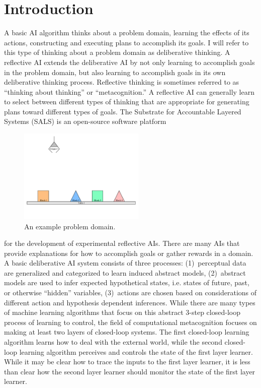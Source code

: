 \chapter{Introduction}
\label{chapter:introduction}

A basic AI algorithm thinks about a problem domain, learning the
effects of its actions, constructing and executing plans to accomplish
its goals.  I will refer to this type of thinking about a problem
domain as deliberative thinking.  A reflective AI extends the
deliberative AI by not only learning to accomplish goals in the
problem domain, but also learning to accomplish goals in its own
deliberative thinking process.  Reflective thinking is sometimes
referred to as ``thinking about thinking'' or ``metacognition.''  A
reflective AI can generally learn to select between different types of
thinking that are appropriate for generating plans toward different
types of goals.  The Substrate for Accountable Layered Systems (SALS)
is an open-source software platform
\begin{figure}
  \includegraphics[width=6cm]{gfx/blocks_world_large-01}
  \caption[An example problem domain.]{An example problem domain.}
  \label{figure:introduction_example_problem_domain}
\end{figure}
for the development of experimental reflective AIs.  There are many
AIs that provide explanations for how to accomplish goals or gather
rewards in a domain.  A basic deliberative AI system consists of three
processes: {\mbox{(1)~perceptual}} data are generalized and
categorized to learn induced abstract models, {\mbox{(2)~abstract}}
models are used to infer expected hypothetical states, i.e. states of
future, past, or otherwise ``hidden'' variables, {\mbox{(3)~actions}}
are chosen based on considerations of different action and hypothesis
dependent inferences.  While there are many types of machine learning
algorithms that focus on this abstract 3-step closed-loop process of
learning to control, the field of computational metacognition
\cite[]{cox_and_raja:2008,cox:2010} focuses on making at least two
layers of closed-loop systems.  The first closed-loop learning
algorithm learns how to deal with the external world, while the second
closed-loop learning algorithm perceives and controls the state of the
first layer learner.  While it may be clear how to trace the inputs to
the first layer learner, it is less than clear how the second layer
learner should monitor the state of the first layer learner.

